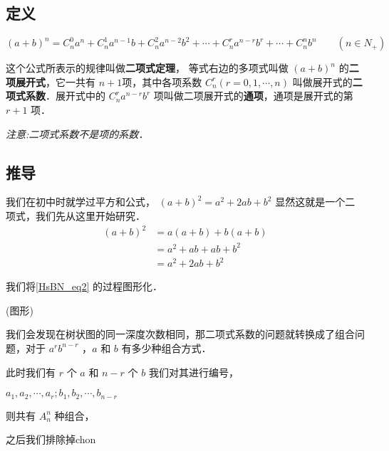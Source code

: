 
\begin{issues}
\issueDraft
\end{issues}
\subsection{定义}
\begin{equation}
(a + b)^n = C_n^0a^n + C_n^1a^{n- 1}b + C_n^2a^{n- 2}b^2 + \cdots + C_n^ra^{n-r}b^r + \cdots + C_n^nb^n \qquad (n\in N_{+})
\end{equation}

这个公式所表示的规律叫做\textbf{二项式定理}，
等式右边的多项式叫做 $(a+b)^n$ 的\textbf{二项展开式}，它一共有 $n+1$项，其中各项系数 $C_n^r(r = 0, 1, \cdots, n)$ 叫做展开式的\textbf{二项式系数}．展开式中的 $C_n^ra^{n-r}b^r$ 项叫做二项展开式的\textbf{通项}，通项是展开式的第 $r+1$ 项．

\textsl{注意:二项式系数不是项的系数．}

\subsection{推导}
我们在初中时就学过平方和公式， $(a+b)^2 = a^2 + 2ab + b^2$ 显然这就是一个二项式，我们先从这里开始研究．
\begin{equation}\label{HsBN_eq2}
\begin{aligned}
(a+b)^2 &= a(a + b) + b(a + b)\\
&= a^2 + ab + ab + b^2\\
&= a^2 + 2ab + b^2
\end{aligned}
\end{equation}

我们将\autoref{HsBN_eq2} 的过程图形化．

(图形)

我们会发现在树状图的同一深度次数相同，那二项式系数的问题就转换成了组合问题，对于 $a^rb^{n-r}$ ，$a$ 和 $b$ 有多少种组合方式．

此时我们有 $r$ 个 $a$ 和 $n-r$ 个 $b$ 我们对其进行编号，

 $a_1,a_2,\cdots,a_r;b_1,b_2,\cdots,b_{n-r}$
 
 则共有 $A_n^n$ 种组合，

 之后我们排除掉chon